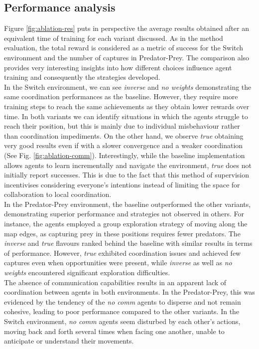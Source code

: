 \documentclass[a4paper,singleside,12pt]{report} %
\begin{document}
\subsection{Performance analysis}\label{res-analysis}
Figure \ref{fig:ablation-res} puts in perspective the average results obtained after an equivalent time of training for each variant discussed. As in the method evaluation, the total reward is considered as a metric of success for the Switch environment and the number of captures in Predator-Prey. The comparison also provides very interesting insights into how different choices influence agent training and consequently the strategies developed.\\
In the Switch environment, we can see \textit{inverse} and \textit{no weights} demonstrating the same coordination performances as the baseline. However, they require more training steps to reach the same achievements as they obtain lower rewards over time. In both variants we can identify situations in which the agents struggle to reach their position, but this is mainly due to individual misbehaviour rather than coordination impediments. On the other hand, we observe \textit{true} obtaining very good results even if with a slower convergence and a weaker coordination (See Fig. \ref{fig:ablation-comm}). Interestingly, while the baseline implementation allows agents to learn incrementally and navigate the environment, \textit{true} does not initially report successes. This is due to the fact that this method of supervision incentivises considering everyone's intentions instead of limiting the space for collaboration to local coordination.\\
In the Predator-Prey environment, the baseline outperformed the other variants, demonstrating superior performance and strategies not observed in others. For instance, the agents employed a group exploration strategy of moving along the map edges, as capturing prey in these positions requires fewer predators. The \textit{inverse} and \textit{true} flavours ranked behind the baseline with similar results in terms of performance. However, \textit{true} exhibited coordination issues and achieved few captures even when opportunities were present, while \textit{inverse} as well as \textit{no weights} encountered significant exploration difficulties.\\
The absence of communication capabilities results in an apparent lack of coordination between agents in both environments. 
In the Predator-Prey, this was evidenced by the tendency of the \textit{no comm} agents to disperse and not remain cohesive, leading to poor performance compared to the other variants. In the Switch environment, \textit{no comm} agents seem disturbed by each other's actions, moving back and forth several times when facing one another, unable to anticipate or understand their movements.\\
\end{document}
